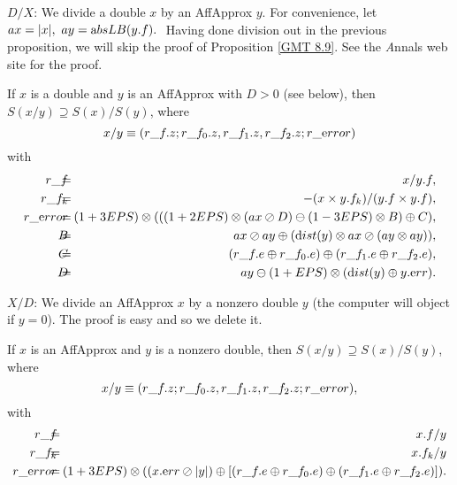 $D/X$:
We   divide a double $x$ by an AffApprox $y$.
For convenience, let $ax = |x|,\ ay = {\textrm absLB}(y.f).\ $  Having done division out in the previous proposition, we will skip the proof of Proposition \ref{GMT 8.9}.  See the {\textit Annals}
web site for the proof.

\begin{proposition}\label{GMT 8.9} If $x$ is a double and $y$ is an 
{\textrm AffApprox}  with $D > 0$ {\textrm (}\/see below{\textrm ),}
 then $S(x / y) \supseteq S(x) / S(y)${\textrm ,} where
$$x / y \equiv (r\_f.z; r\_f_0.z, r\_f_1.z, r\_f_2.z; r\_{\textrm error})$$
with
 \begin{eqnarray*}
r\_f&\hskip-8pt =\hskip-8pt& x / y.f,\\
r\_f_k&\hskip-8pt =\hskip-8pt& -(x \times y.f_k)/ (y.f \times y.f),\\
r\_{\textrm error}&\hskip-8pt =\hskip-8pt& (1+3EPS) \otimes ( 
((1 + 2EPS) \otimes (ax  \oslash D) \ominus (1 - 3EPS) \otimes B)
\oplus C),\\
 B&\hskip-8pt =\hskip-8pt& ax \oslash ay  \oplus ({\textrm dist}(y) \otimes ax \oslash (ay \otimes ay)),\\
C& \hskip-8pt=\hskip-8pt& (r\_f.e \oplus r\_f_0.e)
\oplus (r\_f_1.e \oplus r\_f_2.e),\\
D &\hskip-8pt=\hskip-8pt& ay \ominus (1 + EPS) \otimes ({\textrm dist}(y) \oplus y.{\textrm err}).
\end{eqnarray*}
\end{proposition}

$X/D$:
We   divide an AffApprox $x$ by a nonzero double $y$ (the computer will object if $y = 0$).  The proof is easy  and
so we delete it.

\begin{proposition}\label{GMT 8.10} 
If $x$ is an {\textrm AffApprox}  and $y$ is a nonzero double{\textrm ,} then
$S(x / y) \supseteq S(x) / S(y)${\textrm ,} where
$$x / y \equiv (r\_f.z; r\_f_0.z, r\_f_1.z, r\_f_2.z; r\_{\textrm error}),$$
with
\begin{eqnarray*}
r\_f &\hskip-8pt=\hskip-8pt& x.f / y\\
r\_f_k &\hskip-8pt=\hskip-8pt& x.f_k / y\\
r\_{\textrm error} &\hskip-8pt = \hskip-8pt&
(1+3EPS) \otimes ( 
(x.{\textrm err}\oslash |y|)
\oplus 
[(r\_f.e \oplus r\_f_0.e) \oplus (r\_f_1.e \oplus r\_f_2.e)]
                                               ).\end{eqnarray*}
\end{proposition}

